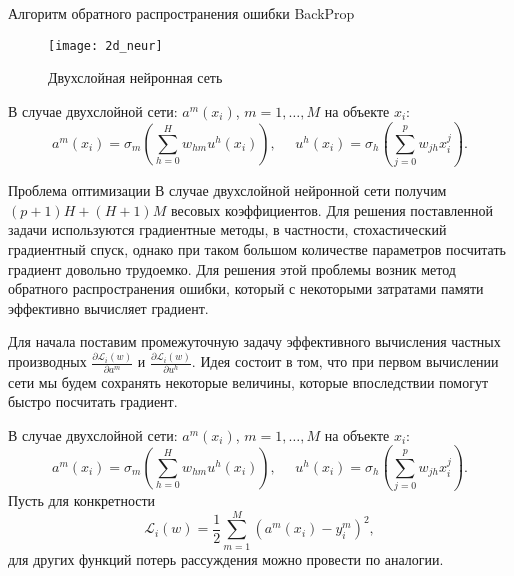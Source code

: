 \documentclass[11pt]{beamer}
\begin{document}
	\begin{frame}{Алгоритм обратного распространения ошибки BackProp}
		\begin{figure}[H]
			\begin{center}
					\texttt{[image: 2d\_neur]}
					\caption{Двухслойная нейронная сеть}
					\label{neuralnetwork}
			\end{center}
		\end{figure}
	В случае двухслойной сети: $a^m(x_i)$, $m=1,\ldots,M$ на объекте $x_i$:
	\begin{equation*}
		a^m(x_i) = \sigma_m \left(\sum_{h=0}^{H} w_{hm}  u^h(x_i)  \right), ~~~~~~
		u^h(x_i) = \sigma_h \left(\sum_{j=0}^{p} w_{jh} x_{i}^j   \right).
	\end{equation*}
	\end{frame}
	
	\begin{frame}{Проблема оптимизации}
		В случае двухслойной нейронной сети получим $(p+1)H+(H+1)M$ весовых коэффициентов. Для решения поставленной задачи используются градиентные методы, в частности, стохастический градиентный спуск, однако при таком большом количестве параметров посчитать градиент довольно трудоемко. Для решения этой проблемы возник метод обратного распространения ошибки, который с некоторыми затратами памяти эффективно вычисляет градиент.
	\end{frame}

	\begin{frame}
		Для начала поставим промежуточную задачу эффективного вычисления частных производных $\frac{\partial \mathcal{L}_i(w)}{\partial a^m}$ и $\frac{\partial \mathcal{L}_i(w)}{\partial u^h}$. Идея состоит в том, что при первом вычислении сети мы будем сохранять некоторые величины, которые впоследствии помогут быстро посчитать градиент.
		
		В случае двухслойной сети: $a^m(x_i)$, $m=1,\ldots,M$ на объекте $x_i$:
		\begin{equation*}
			a^m(x_i) = \sigma_m \left(\sum_{h=0}^{H} w_{hm}  u^h(x_i)  \right), ~~~~~~
			u^h(x_i) = \sigma_h \left(\sum_{j=0}^{p} w_{jh} x_{i}^j   \right).
		\end{equation*}
		Пусть для конкретности
		\begin{equation*}
			\mathcal{L}_i(w) = \frac{1}{2} \sum_{m=1}^{M}(a^m(x_i) - y^m_i)^2,
		\end{equation*}
		для других функций потерь рассуждения можно провести по аналогии.
	\end{frame}
\end{document}
